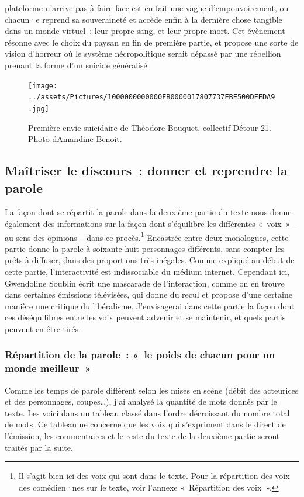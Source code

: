 \documentclass[
]{article}
\begin{document}
plateforme n'arrive pas à faire face est en fait une vague d'empouvoirement, ou chacun·e reprend sa souveraineté et accède enfin à la dernière chose tangible dans un monde virtuel~: leur propre sang, et leur propre mort. Cet évènement résonne avec le choix du paysan en fin de première partie, et propose une sorte de vision d'horreur où le système nécropolitique serait dépassé par une rébellion prenant la forme d'un suicide généralisé.

\begin{figure}
\centering
\texttt{[image: ../assets/Pictures/1000000000000FB0000017807737EBE500DFEDA9.jpg]}
\caption{Première envie suicidaire de Théodore Bouquet, collectif Détour 21. Photo d\textquotesingle Amandine Benoit.}\label{fig:fig-2--2-5}
\end{figure}

\subsection{Maîtriser le discours~: donner et reprendre la parole}\label{mauxeetriser-le-discours-donner-et-reprendre-la-parole}

La façon dont se répartit la parole dans la deuxième partie du texte nous donne également des informations sur la façon dont s'équilibre les différentes «~voix~» -- au sens des opinions -- dans ce procès.\footnote{Il s'agit bien ici des voix qui sont dans le texte. Pour la répartition des voix des comédien·nes sur le texte, voir l'annexe «~Répartition des voix~».} Encastrée entre deux monologues, cette partie donne la parole à soixante-huit personnages différents, sans compter les prêts-à-diffuser, dans des proportions très inégales. Comme expliqué au début de cette partie, l'interactivité est indissociable du médium internet. Cependant ici, Gwendoline Soublin écrit une mascarade de l'interaction, comme on en trouve dans certaines émissions télévisées, qui donne du recul et propose d'une certaine manière une critique du libéralisme. J'envisagerai dans cette partie la façon dont ces déséquilibres entre les voix peuvent advenir et se maintenir, et quels partis peuvent en être tirés.

\subsubsection{Répartition de la parole~: «~le poids de chacun pour un monde meilleur~»}\label{ruxe9partition-de-la-parole-le-poids-de-chacun-pour-un-monde-meilleur}

Comme les temps de parole diffèrent selon les mises en scène (débit des acteurices et des personnages, coupes\ldots), j'ai analysé la quantité de mots donnés par le texte. Les voici dans un tableau classé dans l'ordre décroissant du nombre total de mots. Ce tableau ne concerne que les voix qui s'expriment dans le direct de l'émission, les commentaires et le reste du texte de la deuxième partie seront traités par la suite.
\end{document}

